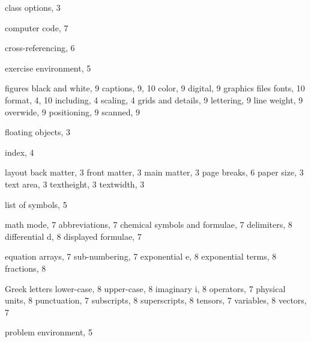 \documentclass[graybox]{svmono}
\begin{document}
\begin{theindex}
\normalsize

\vspace*{-13pc}



\item class options, 3
\item computer code, 7
\item cross-referencing, 6
  \indexspace
\item exercise environment, 5
  \indexspace

  figures
\subitem black and white, 9
\subitem captions, 9, 10
\subitem color, 9
\subitem digital, 9
\subitem graphics files
\subsubitem fonts, 10
\subsubitem format, 4, 10
\subsubitem including, 4
\subsubitem scaling, 4
\subitem grids and details, 9
\subitem lettering, 9
\subitem line weight, 9
\subitem overwide, 9
\subitem positioning, 9
\subitem scanned, 9
\item floating objects, 3

\indexspace

\item index, 4

\indexspace

\item layout
\subitem back matter, 3
\subitem front matter, 3
\subitem main matter, 3
\subitem page breaks, 6
\subitem paper size, 3
\subitem text area, 3
\subitem textheight, 3
\subitem textwidth, 3
\item list of symbols, 5

\indexspace

\item math mode, 7
\subitem abbreviations, 7
\subitem chemical symbols and formulae, 7
\subitem delimiters, 8
\subitem differential d, 8
\subitem displayed formulae, 7

\columnbreak\vspace*{-13pc}

\subitem equation arrays, 7
\subsubitem sub-numbering, 7
\subitem exponential e, 8
\subitem exponential terms, 8
\subitem fractions, 8


\subitem Greek letters
\subsubitem lower-case, 8
\subsubitem upper-case, 8
\subitem imaginary i, 8
\subitem operators, 7
\subitem physical units, 8
\subitem punctuation, 7
\subitem subscripts, 8
\subitem superscripts, 8
\subitem tensors, 7
\subitem variables, 8
\subitem vectors, 7

\indexspace
\item problem environment, 5


\end{theindex}
\end{document}
